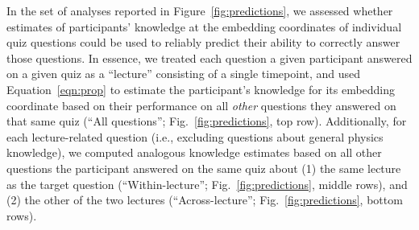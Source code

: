 \documentclass[10pt]{article}
\begin{document}
In the set of analyses reported in Figure~\ref{fig:predictions}, we assessed whether estimates of participants' knowledge at the embedding coordinates of individual quiz questions could be used to reliably predict their ability to correctly answer those questions.
In essence, we treated each question a given participant answered on a given quiz as a ``lecture'' consisting of a single timepoint, and used Equation~\ref{eqn:prop} to estimate the participant's knowledge for its embedding coordinate based on their performance on all \textit{other} questions they answered on that same quiz (``All questions''; Fig.~\ref{fig:predictions}, top row). 
Additionally, for each lecture-related question (i.e., excluding questions about general physics knowledge), we computed analogous knowledge estimates based on all other questions the participant answered on the same quiz about (1) the same lecture as the target question (``Within-lecture''; Fig.~\ref{fig:predictions}, middle rows), and (2) the other of the two lectures (``Across-lecture''; Fig.~\ref{fig:predictions}, bottom rows).
\end{document}
